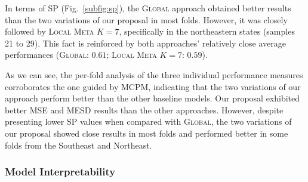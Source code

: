 \documentclass[runningheads]{llncs}
\begin{document}

In terms of SP (Fig.~\ref{subfig:sp}), the \textsc{Global} approach obtained better results than the two variations of our proposal in most folds. However, it was closely followed by \textsc{Local Meta $K=7$}, specifically in the northeastern states (samples 21 to 29). This fact is reinforced by both approaches' relatively close average performances (\textsc{Global}: $0.61$; \textsc{Local Meta $K=7$}: $0.59$).


As we can see, the per-fold analysis of the three individual performance measures corroborates the one guided by MCPM, indicating that the two variations of our approach perform better than the other baseline models. Our proposal exhibited better MSE and MESD results than the other approaches. However, despite presenting lower SP values when compared with \textsc{Global}, the two variations of our proposal showed close results in most folds and performed better in some folds from the Southeast and Northeast.


\subsubsection{Model Interpretability}
\end{document}
